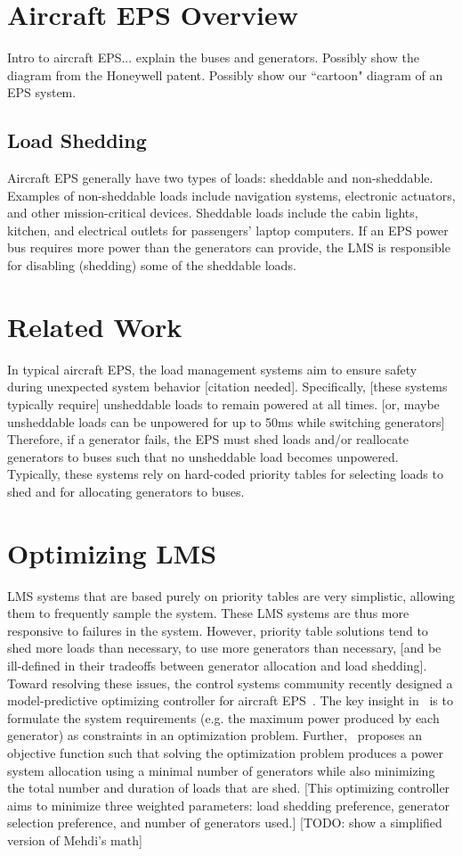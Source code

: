 \documentclass{acm_proc_article-sp}
\begin{document}
\section{Aircraft EPS Overview}
Intro to aircraft EPS... explain the buses and generators.
Possibly show the diagram from the Honeywell patent.
Possibly show our ``cartoon" diagram of an EPS system.

\subsection{Load Shedding}
Aircraft EPS generally have two types of loads: sheddable and non-sheddable.
Examples of non-sheddable loads include navigation systems, electronic actuators, and other mission-critical devices.
Sheddable loads include the cabin lights, kitchen, and electrical outlets for passengers' laptop computers.
If an EPS power bus requires more power than the generators can provide, the LMS is responsible for disabling (shedding) some of the sheddable loads.

\section{Related Work}
\label{sec:related-work}
In typical aircraft EPS, the load management systems aim to ensure safety during unexpected system behavior [citation needed].
Specifically, [these systems typically require] unsheddable loads to remain powered at all times. [or, maybe unsheddable loads can be unpowered for up to 50ms while switching generators]
Therefore, if a generator fails, the EPS must shed loads and/or reallocate generators to buses such that no unsheddable load becomes unpowered.
Typically, these systems rely on hard-coded priority tables for selecting loads to shed and for allocating generators to buses.

\section{Optimizing LMS}
\label{sec:optimizing-LMS}
LMS systems that are based purely on priority tables are very simplistic, allowing them to frequently sample the system. These LMS systems are thus more
responsive to failures in the system.
However, priority table solutions tend to shed more loads than necessary, to use more generators than necessary, [and be ill-defined in their tradeoffs between generator allocation and load shedding].
Toward resolving these issues, the control systems community recently designed a model-predictive optimizing controller for aircraft EPS~\cite{mehdi}.
The key insight in~\cite{mehdi} is to formulate the system requirements (e.g. the maximum power produced by each generator) as constraints in an optimization problem.
Further,~\cite{mehdi} proposes an objective function such that solving the optimization problem produces a power system allocation using a minimal number of generators while also minimizing the total number and duration of loads that are shed. 
[This optimizing controller aims to minimize three weighted parameters: load shedding preference, generator selection preference, and number of generators used.]
[TODO: show a simplified version of Mehdi's math]
\end{document}
